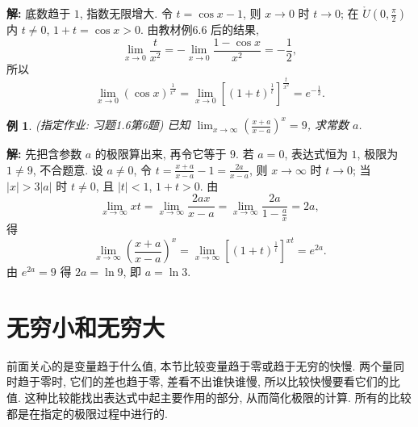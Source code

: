\documentclass[UTF8,openany]{ctexbook}
\theoremstyle{chinesetextbook}
\newtheorem{example}{例}[section]
\newenvironment{cnsolution}{\par\indent\textbf{解:} \ignorespaces}{\par}
\begin{document}
\begin{cnsolution}
底数趋于 $1$, 指数无限增大. 令 $t=\cos x-1$, 则 $x\to0$ 时 $t\to0$; 在 $\displaystyle\mathring U\left(0,\frac\pi2\right)$ 内 $t\ne0$, $1+t=\cos x>0$. 由教材例6.6 后的结果,
\[
\lim_{x\to0}\frac t{x^2}=-\lim_{x\to0}\frac{1-\cos x}{x^2}=-\frac12,
\]
所以
\[
\lim_{x\to0}(\cos x)^{\frac1{x^2}}=\lim_{x\to0}\left[(1+t)^{\frac1t}\right]^{\frac t{x^2}}=e^{-\frac12}.
\]
\end{cnsolution}
\begin{example}
\textnormal{(指定作业: 习题1.6第6题)} 已知 $\displaystyle\lim_{x\to\infty}\left(\frac{x+a}{x-a}\right)^x=9$, 求常数 $a$.
\end{example}
\begin{cnsolution}
先把含参数 $a$ 的极限算出来, 再令它等于 $9$. 若 $a=0$, 表达式恒为 $1$, 极限为 $1\ne9$, 不合题意. 设 $a\ne0$, 令 $\displaystyle t=\frac{x+a}{x-a}-1=\frac{2a}{x-a}$, 则 $x\to\infty$ 时 $t\to0$; 当 $|x|>3|a|$ 时 $t\ne0$, 且 $|t|<1$, $1+t>0$. 由
\[
\lim_{x\to\infty}xt=\lim_{x\to\infty}\frac{2ax}{x-a}=\lim_{x\to\infty}\frac{2a}{1-\frac ax}=2a,
\]
得
\[
\lim_{x\to\infty}\left(\frac{x+a}{x-a}\right)^x=\lim_{x\to\infty}\left[(1+t)^{\frac1t}\right]^{xt}=e^{2a}.
\]
由 $e^{2a}=9$ 得 $2a=\ln9$, 即 $a=\ln3$.
\end{cnsolution}
\section{无穷小和无穷大}
前面关心的是变量趋于什么值, 本节比较变量趋于零或趋于无穷的快慢. 两个量同时趋于零时, 它们的差也趋于零, 差看不出谁快谁慢, 所以比较快慢要看它们的比值. 这种比较能找出表达式中起主要作用的部分, 从而简化极限的计算. 所有的比较都是在指定的极限过程中进行的.
\end{document}
